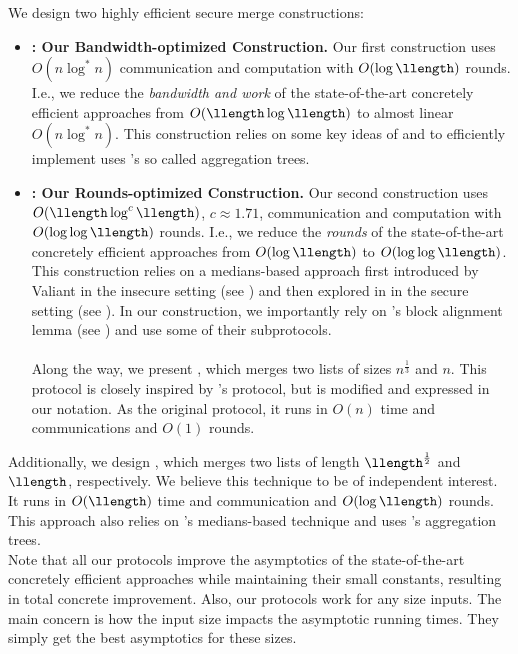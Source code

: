 We design two highly efficient secure merge constructions:

\begin{itemize}
  \item \textbf{\ourapproach: Our Bandwidth-optimized Construction.} Our first construction uses $O(n \log^* n)$ communication and computation with $O(\log\llength)$ rounds. I.e., we reduce the \emph{bandwidth and work} of the state-of-the-art concretely efficient approaches from $O(\llength\log\llength)$ to almost linear $O(n \log^* n)$. This construction relies on some key ideas of \cite{ITC:FalOst21}
  and to efficiently implement uses \cite{CCS:BDGRR22}'s so called aggregation trees.
    \item \textbf{\ourapproachtwo: Our Rounds-optimized Construction.} Our second construction uses $O(\llength \log^c \llength)$, $c \approx1.71$, communication and computation with $O(\log\log\llength)$ rounds. I.e., we reduce the \emph{rounds} of the state-of-the-art concretely efficient approaches from $O(\log\llength)$ to $O(\log\log\llength)$. This construction relies on a medians-based approach first introduced by Valiant \cite{JC:Val75} in the insecure setting (see ) and then explored in \cite{EPRINT:BBDLO22} in the secure setting (see ). In our construction, we importantly rely on \cite{EPRINT:BBDLO22}'s block alignment lemma (see ) and use some of their subprotocols. \\
    \\
    Along the way, we present \knmerge, which merges two lists of sizes $n^{\frac{1}{3}}$ and $n$. This protocol is closely inspired by \cite{EPRINT:BBDLO22}'s protocol, but is modified and expressed in our notation. As the original protocol, it runs in $O(n)$ time and communications and $O(1)$ rounds.
\end{itemize}

\noindent Additionally, we design \sqrtmerge, which merges two lists of length $\llength^{\frac{1}{2}}$ and $\llength$, respectively. We believe this technique to be of independent interest. It runs in $O(\llength)$ time and communication and $O(\log\llength)$ rounds. This approach also relies on \cite{JC:Val75,EPRINT:BBDLO22}'s medians-based technique and uses \cite{CCS:BDGRR22}'s aggregation trees. \\

\noindent Note that all our protocols improve the asymptotics of the state-of-the-art concretely efficient approaches while maintaining their small constants, resulting in total concrete improvement. Also, our protocols work for any size inputs. The main concern is how the input size impacts the asymptotic running times. They simply get the best asymptotics for these sizes. \\

